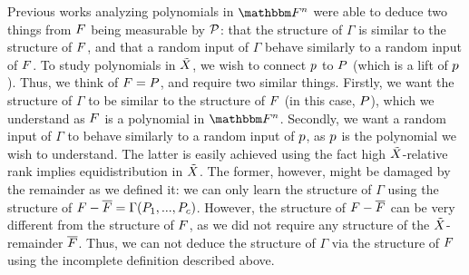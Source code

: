 Previous works analyzing polynomials in $\field$ were able to deduce two things from $\genfunc$ being measurable by $\genpolyset$:
that the structure of $\Gamma$ is similar to the structure of $\genfunc$, and that a random input of $\Gamma$ behave similarly to a random input of $\genfunc$.
\newline
To study polynomials in ${\tilde{X}}$, we wish to connect $\onvarpoly$ to $\genpoly$ (which is a lift of $\onvarpoly$).
Thus, we think of $\genfunc = \genpoly$, and require two similar things.
Firstly, we want the structure of $\Gamma$ to be similar to the structure of $\genfunc$ (in this case, $\genpoly$), which we understand as $\genfunc$ is a polynomial in $\field$.
Secondly, we want a random input of $\Gamma$ to behave similarly to a random input of $\onvarpoly$, as $\onvarpoly$ is the polynomial we wish to understand.
The latter is easily achieved using the fact high ${\tilde{X}}$-relative rank implies equidistribution in ${\tilde{X}}$.
The former, however, might be damaged by the remainder as we defined it: we can only learn the structure of $\Gamma$ using the structure of $\genfunc - \relativeremainder{\genfunc} = \Gamma(\genpoly_1,...,\genpoly_c)$.
However, the structure of $\genfunc - \relativeremainder{\genfunc}$ can be very different from the structure of $\genfunc$,
as we did not require any structure of the ${\tilde{X}}$-remainder $\relativeremainder{\genfunc}$.
Thus, we can not deduce the structure of $\Gamma$ via the structure of $\genfunc$ using the incomplete definition described above.

